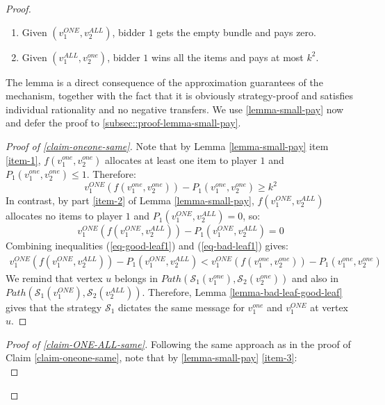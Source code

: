 \begin{proof}
\begin{lemma}
\begin{enumerate}
        \item  Given $(v_1^{ONE},v_2^{ALL})$, bidder $1$ gets the empty bundle and pays zero.   \label{item-2}
        \item Given $(v_1^{ALL},v_2^{one})$, bidder $1$ wins all the items and pays at most $k^2$. \label{item-3}  
    \end{enumerate}
\end{lemma}
The lemma is a direct consequence of the approximation guarantees of the mechanism, together with the fact that it is obviously strategy-proof and satisfies individual rationality and no negative transfers.  We use \cref{lemma-small-pay} 
 now and defer the proof to \cref{subsec::proof-lemma-small-pay}.
\begin{proof}[Proof of \cref{claim-oneone-same}]
     Note that by Lemma \ref{lemma-small-pay} item \ref{item-1}, $f(v_1^{one},v_2^{one})$ allocates at least one item to player $1$ and $P_1(v_1^{one},v_2^{one})\le 1$. Therefore:
\begin{equation}\label{eq-good-leaf1}
 v_1^{ONE}(f(v_1^{one},v_2^{one}))-P_1(v_1^{one},v_2^{one})\ge k^2   
\end{equation}
 In contrast, by part \ref{item-2} of Lemma \ref{lemma-small-pay},   $f(v_1^{ONE},v_2^{ALL})$ allocates no items to player $1$ and $P_1(v_1^{ONE},v_2^{ALL})=0$, so:
 \begin{equation}\label{eq-bad-leaf1}
 v_1^{ONE}(f(v_1^{ONE},v_2^{ALL}))-P_1(v_1^{ONE},v_2^{ALL})= 0   
\end{equation}
Combining inequalities (\ref{eq-good-leaf1}) and (\ref{eq-bad-leaf1}) gives:
\begin{align*}
  v_1^{ONE}(f(v_1^{ONE},v_2^{ALL}))-P_1(v_1^{ONE},v_2^{ALL})< 
  v_1^{ONE}(f(v_1^{one},v_2^{one}))-P_1(v_1^{one},v_2^{one})  
\end{align*}
We remind that vertex $u$ belongs in $Path(\mathcal S_1(v_1^{one}),\mathcal S_2(v_2^{one}))$ and also in
$Path(\mathcal{S}_1(v_1^{ONE}),\allowbreak\mathcal{S}_2(v_2^{ALL}))$. Therefore, Lemma \ref{lemma-bad-leaf-good-leaf} gives that the strategy $\mathcal S_1$ dictates the same message for  $v_1^{one}$ and $v_1^{ONE}$ at vertex $u$. 
\end{proof}
\begin{proof}[Proof of \cref{claim-ONE-ALL-same}]
    Following the same approach as in the proof of Claim \ref{claim-oneone-same}, note that by \cref{lemma-small-pay} \cref{item-3}: 
\begin{equation}\label{break-align}

\end{equation}
\end{proof}
\end{proof}
